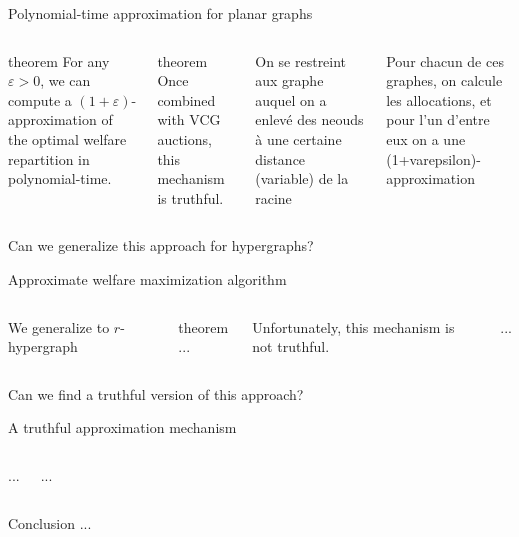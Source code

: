 \documentclass[aspectratio=169]{beamer}
\begin{document}
\begin{frame}{Polynomial-time approximation for planar graphs}
    \begin{columns}
        \begin{block}{theorem}
            For any $\varepsilon > 0$, we can compute a $(1 + \varepsilon)$-approximation of the optimal welfare repartition in polynomial-time.
        \end{block}

        \begin{block}{theorem}
            Once combined with VCG auctions, this mechanism is truthful.
        \end{block}

        On se restreint aux graphe auquel on a enlevé des neouds à une certaine distance (variable) de la racine

        Pour chacun de ces graphes, on calcule les allocations, et pour l'un d'entre eux on a une (1+varepsilon)-approximation


    \end{columns}
\end{frame}

\begin{frame}[standout]
    Can we generalize this approach for \alert{hypergraphs}?
\end{frame}

\begin{frame}{Approximate welfare maximization algorithm}
    \begin{columns}
        We generalize to $r$-hypergraph

        \begin{block}{theorem}
            ...
        \end{block}

        Unfortunately, this mechanism is not truthful.

        ...
    \end{columns}
\end{frame}

\begin{frame}[standout]
    Can we find a \alert{truthful version} of this approach?
\end{frame}

\begin{frame}{A truthful approximation mechanism}
    \begin{columns}
        ...

        ...
    \end{columns}
\end{frame}

\begin{frame}{Conclusion}
    ...
\end{frame}
\end{document}
